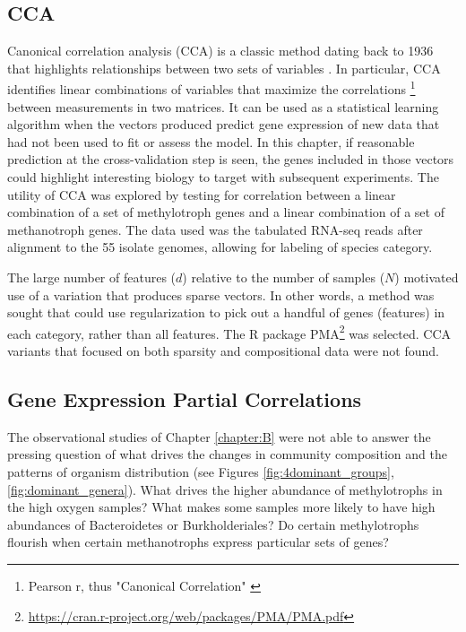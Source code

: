 \subsection{CCA}
Canonical correlation analysis (CCA) is a classic method dating back to 1936 \cite{hotelling1936} that highlights relationships between two sets of variables \cite{sherry2005}.
In particular, CCA identifies linear combinations of variables that maximize the correlations \footnote{Pearson r, thus "Canonical Correlation" \cite{sherry2005}} between measurements in two matrices.
It can be used as a statistical learning algorithm when the vectors produced predict gene expression of new data that had not been used to fit or assess the model.
In this chapter, if reasonable prediction at the cross-validation step is seen, the genes included in those vectors could highlight interesting biology to target with subsequent experiments.
The utility of CCA was explored by testing for correlation between a linear combination of a set of methylotroph genes and a linear combination of a set of methanotroph genes.
The data used was the tabulated RNA-seq reads after alignment to the 55 isolate genomes, allowing for labeling of species category.

The large number of features ($d$) relative to the number of samples ($N$) motivated use of a variation that produces sparse vectors.
In other words, a method was sought that could use regularization to pick out a handful of genes (features) in each category, rather than all features.
The R package PMA\footnote{\url{https://cran.r-project.org/web/packages/PMA/PMA.pdf}} \cite{witten2009} was selected.
CCA variants that focused on both sparsity and compositional data were not found.

\subsection{Gene Expression Partial Correlations}

The observational studies of Chapter \ref{chapter:B} were not able to answer the pressing question of what drives the changes in community composition and the patterns of organism distribution (see Figures \ref{fig:4dominant_groups}, \ref{fig:dominant_genera}).
What drives the higher abundance of methylotrophs in the high oxygen samples? %
What makes some samples more likely to have high abundances of Bacteroidetes or Burkholderiales?
Do certain methylotrophs flourish when certain methanotrophs express particular sets of genes?

